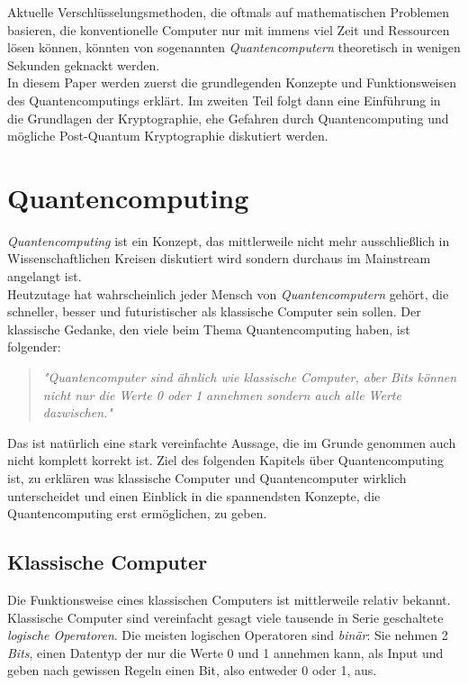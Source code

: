 \documentclass[12pt]{IEEEtran}
\begin{document}
 Aktuelle Verschlüsselungsmethoden, die oftmals auf mathematischen Problemen basieren, die konventionelle Computer nur mit immens viel Zeit und Ressourcen lösen können, könnten von sogenannten \textit{Quantencomputern} theoretisch in wenigen Sekunden geknackt werden. \\

In diesem Paper werden zuerst die grundlegenden Konzepte und Funktionsweisen des Quantencomputings erklärt. Im zweiten Teil folgt dann eine Einführung in die Grundlagen der Kryptographie, ehe Gefahren durch Quantencomputing und mögliche Post-Quantum Kryptographie diskutiert werden.

\section{Quantencomputing}

\textit{Quantencomputing} ist ein Konzept, das mittlerweile nicht mehr ausschließlich in Wissenschaftlichen Kreisen diskutiert wird sondern durchaus im Mainstream angelangt ist.\\
Heutzutage hat wahrscheinlich jeder Mensch von \textit{Quantencomputern} gehört, die schneller, besser und futuristischer als klassische Computer sein sollen. Der klassische Gedanke, den viele beim Thema Quantencomputing haben, ist folgender:

\begin{quote}
    \textit{"Quantencomputer sind ähnlich wie klassische Computer, aber Bits können nicht nur die Werte 0 oder 1 annehmen sondern auch alle Werte dazwischen."}
\end{quote}

Das ist natürlich eine stark vereinfachte Aussage, die im Grunde genommen auch nicht komplett korrekt ist. Ziel des folgenden Kapitels über Quantencomputing ist, zu erklären was klassische Computer und Quantencomputer wirklich unterscheidet und einen Einblick in die spannendsten Konzepte, die Quantencomputing erst ermöglichen, zu geben.

\subsection{Klassische Computer}

Die Funktionsweise eines klassischen Computers ist mittlerweile relativ bekannt. Klassische Computer sind vereinfacht gesagt viele tausende in Serie geschaltete \textit{logische Operatoren}. Die meisten logischen Operatoren sind \textit{binär}: Sie nehmen 2 \textit{Bits}, einen Datentyp der nur die Werte 0 und 1 annehmen kann, als Input und geben nach gewissen Regeln einen Bit, also entweder 0 oder 1, aus. \cite{quantum1998} \\
\end{document}
